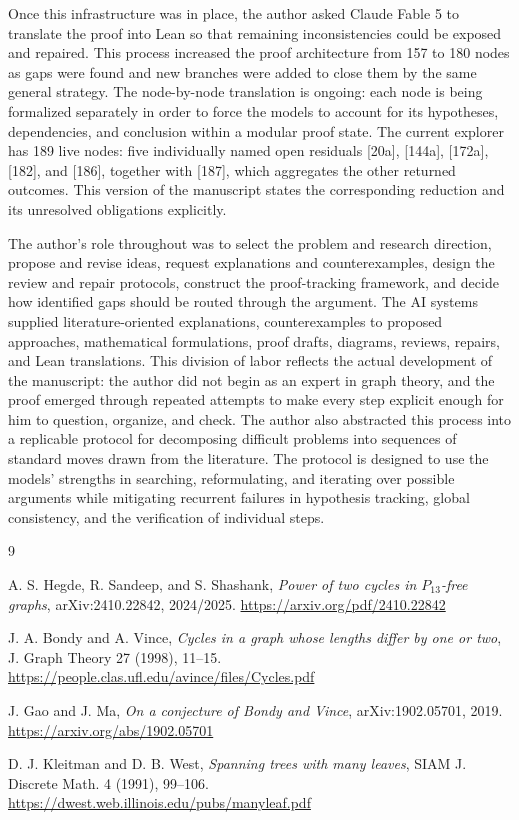 \documentclass[11pt]{article}
\begin{document}
Once this infrastructure was in place, the author asked Claude Fable 5 to
translate the proof into Lean so that remaining inconsistencies could be
exposed and repaired.  This process increased the proof architecture from 157
to 180 nodes as gaps were found and new branches were added to close them by
the same general strategy.  The node-by-node translation is ongoing: each node
is being formalized separately in order to force the models to account for its
hypotheses, dependencies, and conclusion within a modular proof state.
The current explorer has 189 live nodes: five individually named open
residuals [20a], [144a], [172a], [182], and [186], together with [187],
which aggregates the other returned outcomes.  This version of the manuscript states the corresponding
reduction and its unresolved obligations explicitly.

The author's role throughout was to select the problem and research direction,
propose and revise ideas, request explanations and counterexamples, design the
review and repair protocols, construct the proof-tracking framework, and decide
how identified gaps should be routed through the argument.  The AI systems
supplied literature-oriented explanations, counterexamples to proposed
approaches, mathematical formulations, proof drafts, diagrams, reviews,
repairs, and Lean translations.  This division of labor reflects the actual
development of the manuscript: the author did not begin as an expert in graph
theory, and the proof emerged through repeated attempts to make every step
explicit enough for him to question, organize, and check.  The author also
abstracted this process into a replicable protocol for decomposing difficult
problems into sequences of standard moves drawn from the literature.  The
protocol is designed to use the models' strengths in searching, reformulating,
and iterating over possible arguments while mitigating recurrent failures in
hypothesis tracking, global consistency, and the verification of individual
steps.

\begin{thebibliography}{9}

A. S. Hegde, R. Sandeep, and S. Shashank,
\emph{Power of two cycles in $P_{13}$-free graphs},
arXiv:2410.22842, 2024/2025.
\url{https://arxiv.org/pdf/2410.22842}

J. A. Bondy and A. Vince,
\emph{Cycles in a graph whose lengths differ by one or two},
J. Graph Theory 27 (1998), 11--15.
\url{https://people.clas.ufl.edu/avince/files/Cycles.pdf}

J. Gao and J. Ma,
\emph{On a conjecture of Bondy and Vince},
arXiv:1902.05701, 2019.
\url{https://arxiv.org/abs/1902.05701}

D. J. Kleitman and D. B. West,
\emph{Spanning trees with many leaves},
SIAM J. Discrete Math. 4 (1991), 99--106.
\url{https://dwest.web.illinois.edu/pubs/manyleaf.pdf}

\end{thebibliography}
\end{document}
